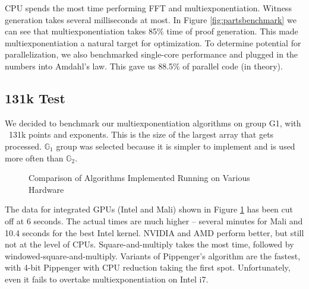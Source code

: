 \noindent CPU spends the most time performing FFT and multiexponentiation. Witness generation takes several milliseconds at most. In Figure \ref{fig:partsbenchmark} we can see that multiexponentiation takes 85\% time of proof generation. This made multiexponentiation a natural target for optimization. To determine potential for parallelization, we also benchmarked single-core performance and plugged in the numbers into Amdahl's law. This gave us 88.5\% of parallel code (in theory).\\

\subsection{131k Test}

We decided to benchmark our multiexponentiation algorithms on group G1, with ~131k points and exponents. This is the size of the largest array that gets processed. $\mathbb{G}_1$ group was selected because it is simpler to implement and is used more often than $\mathbb{G}_2$.
\begin{figure}[h]
    \begin{center}
    \caption{Comparison of Algorithms Implemented Running on Various Hardware}
    \label{fig:finalresults}
    \end{center}
\end{figure}
 \noindent The data for integrated GPUs (Intel and Mali) shown in Figure \ref{fig:finalresults} has been cut off at 6 seconds. The actual times are much higher -- several minutes for Mali and 10.4 seconds for the best Intel kernel. NVIDIA and AMD perform better, but still not at the level of CPUs. Square-and-multiply takes the most time, followed by windowed-square-and-multiply. Variants of Pippenger's algorithm are the fastest, with 4-bit Pippenger with CPU reduction taking the first spot. Unfortunately, even it fails to overtake multiexponentiation on Intel i7.
